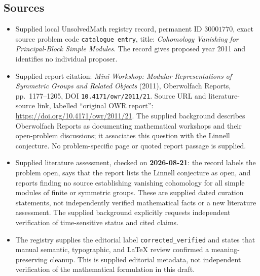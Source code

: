 \documentclass[11pt]{article}
\begin{document}
\subsection{Sources}
\begin{itemize}
\item Supplied local UnsolvedMath registry record, permanent ID \(30001770\), exact source problem code \texttt{catalogue entry}, title: \emph{Cohomology Vanishing for Principal-Block Simple Modules}. The record gives proposed year 2011 and identifies no individual proposer.
\item Supplied report citation: \emph{Mini-Workshop: Modular Representations of Symmetric Groups and Related Objects} (2011), Oberwolfach Reports, pp.~1177--1205, DOI \texttt{10.4171/owr/2011/21}. Source URL and literature-source link, labelled ``original OWR report'': \url{https://doi.org/10.4171/owr/2011/21}. The supplied background describes Oberwolfach Reports as documenting mathematical workshops and their open-problem discussions; it associates this question with the Linnell conjecture. No problem-specific page or quoted report passage is supplied.
\item Supplied literature assessment, checked on \textbf{2026-08-21}: the record labels the problem open, says that the report lists the Linnell conjecture as open, and reports finding no source establishing vanishing cohomology for all simple modules of finite or symmetric groups. These are supplied dated curation statements, not independently verified mathematical facts or a new literature assessment. The supplied background explicitly requests independent verification of time-sensitive status and cited claims.
\item The registry supplies the editorial label \texttt{corrected\_verified} and states that manual semantic, typographic, and LaTeX review confirmed a meaning-preserving cleanup. This is supplied editorial metadata, not independent verification of the mathematical formulation in this draft.
\end{itemize}
\end{document}
